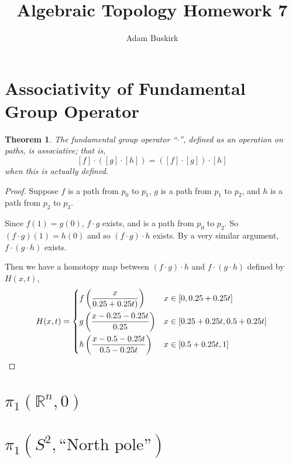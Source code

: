 \documentclass{article}
\title{Algebraic Topology Homework 7}
\author{Adam Buskirk}
\newtheorem{theorem}[subsection]{Theorem}
\theoremstyle{definition}
\newcommand{\R}{\mathbb{R}}
\newcommand{\p}[1]{\left(#1\right)}
\begin{document}
\maketitle

\section{Associativity of Fundamental Group Operator}
\begin{theorem}
The fundamental group operator ``$\cdot$'', defined as an operation 
on paths, is associative; that is,
\[ 
[f] \cdot ([g] \cdot [h]) 
= 
([f] \cdot [g]) \cdot [h]
\]
when this is actually defined.
\end{theorem}
\begin{proof}
Suppose $f$ is a path from $p_0$ to $p_1$, $g$ is a path from $p_1$ to
$p_2$, and $h$ is a path from $p_2$ to $p_3$.

Since $f(1)=g(0)$, $f \cdot g$ exists, and is a path from $p_0$ to $p_2$.
So $(f \cdot g)(1) = h(0)$ and so $(f \cdot g) \cdot h$ exists. By a very
similar argument, $f \cdot (g \cdot h)$ exists.

Then we have a homotopy map between $(f \cdot g) \cdot h$ and 
$f \cdot (g \cdot h)$ defined by $H(x,t)$,
\[
H(x,t)
=
\begin{dcases}
f\p{\frac{x}{0.25+0.25t)}} & x \in [0, 0.25 + 0.25t] \\
g\p{\frac{x-0.25-0.25t}{0.25}} & x \in [0.25+0.25t, 0.5 + 0.25t] \\
h\p{\frac{x-0.5-0.25t}{0.5-0.25t}} & x \in [0.5 + 0.25t,1]
\end{dcases}
\]
\end{proof}

\section{$\pi_1(\R^n,0)$}

\section{$\pi_1(S^2,\text{``North pole''})$}
\end{document}

